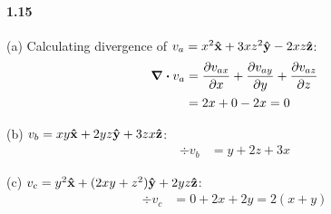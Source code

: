 \documentclass[../main.tex]{subfiles}
\begin{document}
\paragraph{1.15}
(a) Calculating divergence of $v_a = x^2\vu{x} + 3xz^2\vu{y} - 2xz\vu{z}$:
\begin{align*}
    \div{v_a} &= \pdv{v_{ax}}{x} + \pdv{v_{ay}}{y} + \pdv{v_{az}}{z} \\
    &= 2x + 0 - 2x = 0
\end{align*}

(b) $v_b = xy\vu{x} + 2yz\vu{y} + 3zx\vu{z}$:
\begin{align*}
    \div{v_b} &= y + 2z + 3x
\end{align*}

(c) $v_c = y^2\vu{x} + (2xy + z^2)\vu{y} + 2yz\vu{z}$:
\begin{align*}
    \div{v_c} &= 0 + 2x + 2y = 2(x + y)
\end{align*}
\end{document}
